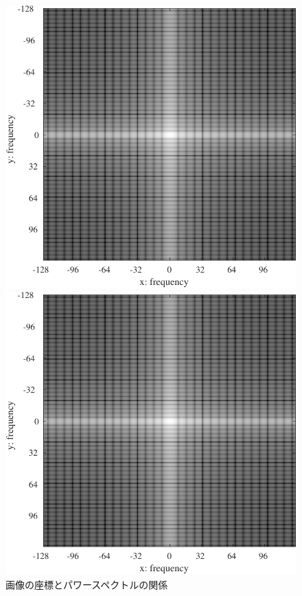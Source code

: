 \begin{figure}[H]
\begin{minipage}[b]{.2\textwidth}
    \end{minipage}
    \begin{minipage}[b]{.25\textwidth}
        \centering
        \includegraphics[keepaspectratio,width=.8\textwidth]{../../Figures/08_33_rec1-fft.pdf}
    \end{minipage}
    \begin{minipage}[b]{.25\textwidth}
        \centering
        \includegraphics[keepaspectratio,width=.8\textwidth]{../../Figures/08_34_rec2-fft.pdf}
    \end{minipage}
    \caption{画像の座標とパワースペクトルの関係}
\end{figure}
